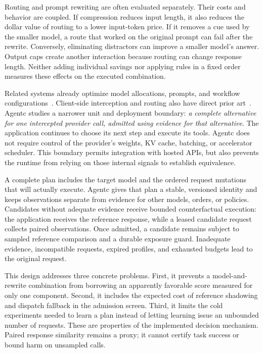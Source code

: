 Routing and prompt rewriting are often evaluated separately. Their costs and
behavior are coupled. If compression reduces input length, it also reduces the
dollar value of routing to a lower input-token price. If it removes a cue used by
the smaller model, a route that worked on the original prompt can fail after the
rewrite. Conversely, eliminating distractors can improve a smaller model's answer.
Output caps create another interaction because routing can change response length.
Neither adding individual savings nor applying rules in a fixed order measures
these effects on the executed combination.

Related systems already optimize model allocations, prompts, and workflow
configurations~\cite{chen2025llmselector,he2025cognify,chaudhry2025murakkab}.
Client-side interception and routing also have direct prior
art~\cite{hua2026agentopt}. Agentc studies a narrower unit and deployment boundary:
\emph{a complete alternative for one intercepted provider call, admitted using
evidence for that alternative}. The application continues to choose its next step
and execute its tools. Agentc does not require control of the provider's weights,
KV cache, batching, or accelerator scheduler. This boundary permits integration
with hosted APIs, but also prevents the runtime from relying on those internal
signals to establish equivalence.

A complete plan includes the target model and the ordered request mutations that
will actually execute. Agentc gives that plan a stable, versioned identity and
keeps observations separate from evidence for other models, orders, or policies.
Candidates without adequate evidence receive bounded counterfactual execution:
the application receives the reference response, while a leased candidate request
collects paired observations. Once admitted, a candidate remains subject to sampled
reference comparison and a durable exposure guard. Inadequate evidence, incompatible
requests, expired profiles, and exhausted budgets lead to the original request.

This design addresses three concrete problems. First, it prevents a model-and-rewrite
combination from borrowing an apparently favorable score measured for only one
component. Second, it includes the expected cost of reference shadowing and dispatch
fallback in the admission screen. Third, it limits the cold experiments needed to
learn a plan instead of letting learning issue an unbounded number of requests.
These are properties of the implemented decision mechanism. Paired response
similarity remains a proxy; it cannot certify task success or bound harm on
unsampled calls.

